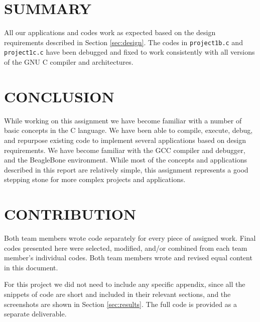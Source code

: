 \documentclass[letterpaper, 12pt]{article}
\begin{document}
\section{SUMMARY}
\label{sec:summary}

All our applications and codes work as expected based on the design requirements described in Section \ref{sec:design}. The codes in \verb+project1b.c+ and \verb+project1c.c+ have been debugged and fixed to work consistently with all versions of the GNU C compiler and architectures.


\section{CONCLUSION}
\label{sec:conclusions}

While working on this assignment we have become familiar with a number of basic concepts in the C language. We have been able to compile, execute, debug, and repurpose existing code to implement several applications based on design requirements. We have become familiar with the GCC compiler and debugger, and the BeagleBone environment. While most of the concepts and applications described in this report are relatively simple, this assignment represents a good stepping stone for more complex projects and applications.

\clearpage

\hypertarget{appendixstart}{\appendix} %

\section{CONTRIBUTION}

Both team members wrote code separately for every piece of assigned work.  Final codes presented here were selected, modified, and/or combined from each team member's individual codes.  Both team members wrote and revised equal content  in this document.

For this project we did not need to include any specific appendix, since all the snippets of code are short and included in their relevant sections, and the screenshots are shown in Section \ref{sec:results}. The full code is provided as a separate deliverable.
\end{document}
